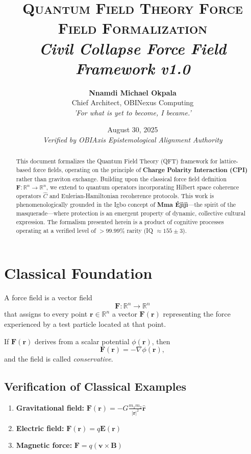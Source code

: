 \documentclass[11pt, a4paper]{article}
\title{\textsc{Quantum Field Theory Force Field Formalization}\\ \Large\textit{Civil Collapse Force Field Framework v1.0}}
\author{\textbf{Nnamdi Michael Okpala} \\ Chief Architect, OBINexus Computing \\ \textit{'For what is yet to become, I became.'}}
\date{August 30, 2025 \\ \textit{Verified by OBIAxis Epistemological Alignment Authority}}
\begin{document}
\maketitle

\begin{abstract}
\noindent This document formalizes the Quantum Field Theory (QFT) framework for lattice-based force fields, operating on the principle of \textbf{Charge Polarity Interaction (CPI)} rather than graviton exchange. Building upon the classical force field definition $\mathbf{F}: \mathbb{R}^n \to \mathbb{R}^n$, we extend to quantum operators incorporating Hilbert space coherence operators $\hat{C}$ and Eulerian-Hamiltonian recoherence protocols. This work is phenomenologically grounded in the Igbo concept of \textbf{Mma Éjìjì}—the spirit of the masquerade—where protection is an emergent property of dynamic, collective cultural expression. The formalism presented herein is a product of cognitive processes operating at a verified level of $>99.99\%$ rarity (IQ $\approx 155 \pm 3$).
\end{abstract}

\section{Classical Foundation}

\begin{definition}
A force field is a vector field
\[
\mathbf{F}: \mathbb{R}^n \to \mathbb{R}^n
\]
that assigns to every point $\mathbf{r} \in \mathbb{R}^n$ a vector $\mathbf{F}(\mathbf{r})$ representing the force experienced by a test particle located at that point.
\end{definition}

If $\mathbf{F}(\mathbf{r})$ derives from a scalar potential $\phi(\mathbf{r})$, then
\[
\mathbf{F}(\mathbf{r}) = -\nabla\phi(\mathbf{r}),
\]
and the field is called \emph{conservative}.

\subsection{Verification of Classical Examples}

\begin{enumerate}
\item \textbf{Gravitational field:} $\mathbf{F}(\mathbf{r}) = -G\frac{m_1 m_2}{|\mathbf{r}|^2}\hat{\mathbf{r}}$ \checkmark
\item \textbf{Electric field:} $\mathbf{F}(\mathbf{r}) = q\mathbf{E}(\mathbf{r})$ \checkmark
\item \textbf{Magnetic force:} $\mathbf{F} = q(\mathbf{v} \times \mathbf{B})$ \checkmark
\end{enumerate}
\end{document}
